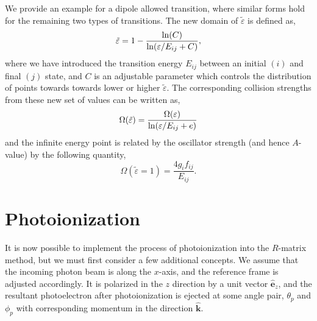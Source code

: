 We provide an example for a dipole allowed transition, where similar forms hold for the remaining two types of transitions. The new domain of $\tilde{\varepsilon}$ is defined as,
\[
\tilde{\varepsilon} = 1-\frac{{\rm ln}(C)}{{\rm ln}(\varepsilon/E_{ij}+C)},
\]
where we have introduced the transition energy $E_{ij}$ between an initial $(i)$ and final $(j)$ state, and $C$ is an adjustable parameter which controls the distribution of points towards towards lower or higher $\tilde{\varepsilon}$. The corresponding collision strengths from these new set of values can be written as,
\[
\Omega(\tilde{\varepsilon}) = \frac{\Omega(\varepsilon)}{{\rm ln}(\varepsilon/E_{ij}+ e)}
\]
and the infinite energy point is related by the oscillator strength (and hence $A$-value) by the following quantity,
\[
\Omega(\tilde{\varepsilon} = 1) = \frac{4g_if_{ij}}{E_{ij}}.
\]

\section{Photoionization}\label{sec:photon}
It is now possible to implement the process of photoionization into the $R$-matrix method, but we must first consider a few additional concepts. We assume that the incoming photon beam is along the $x$-axis, and the reference frame is adjusted accordingly. It is polarized in the $z$ direction by a unit vector $\boldsymbol{\hat{e}}_z$, and the resultant photoelectron after photoionization is ejected at some angle pair, $\theta_p$ and $\phi_p$ with corresponding momentum in the direction $\boldsymbol{\hat{k}}$.

